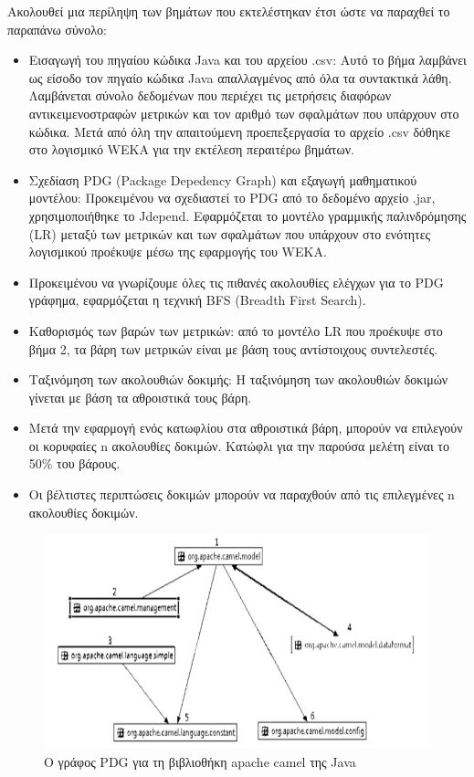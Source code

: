 \documentclass[12pt]{article}
\begin{document}
\par Ακολουθεί μια περίληψη των βημάτων που εκτελέστηκαν έτσι ώστε να παραχθεί το παραπάνω σύνολο:

\begin{itemize}
\item Εισαγωγή του πηγαίου κώδικα Java και του αρχείου .csv: Αυτό το βήμα λαμβάνει ως είσοδο τον πηγαίο κώδικα Java απαλλαγμένος από όλα τα συντακτικά λάθη. Λαμβάνεται σύνολο δεδομένων που περιέχει τις μετρήσεις διαφόρων αντικειμενοστραφών μετρικών και τον αριθμό των σφαλμάτων που υπάρχουν στο κώδικα. Μετά από όλη την απαιτούμενη προεπεξεργασία το αρχείο .csv δόθηκε στο λογισμικό WEKA για την εκτέλεση περαιτέρω βημάτων.

\item Σχεδίαση PDG (Package Depedency Graph) και εξαγωγή μαθηματικού μοντέλου: Προκειμένου να σχεδιαστεί το PDG από το δεδομένο αρχείο .jar, χρησιμοποιήθηκε το Jdepend. Εφαρμόζεται το μοντέλο γραμμικής παλινδρόμησης (LR) μεταξύ των μετρικών και των σφαλμάτων που υπάρχουν στο ενότητες λογισμικού προέκυψε μέσω της εφαρμογής του WEKA.

\item Προκειμένου να γνωρίζουμε όλες τις πιθανές ακολουθίες ελέγχων για το PDG γράφημα, εφαρμόζεται η τεχνική BFS (Breadth First Search).

\item Καθορισμός των βαρών των μετρικών: από το μοντέλο LR που προέκυψε στο βήμα 2, τα βάρη των μετρικών είναι με βάση τους αντίστοιχους συντελεστές.

\item Ταξινόμηση των ακολουθιών δοκιμής: Η ταξινόμηση των ακολουθιών δοκιμών γίνεται με βάση τα αθροιστικά τους βάρη. 

\item Μετά την εφαρμογή ενός κατωφλίου στα αθροιστικά βάρη, μπορούν να επιλεγούν οι κορυφαίες n ακολουθίες δοκιμών. Κατώφλι για την παρούσα μελέτη είναι το 50\% του βάρους.

\item Οι βέλτιστες περιπτώσεις δοκιμών μπορούν να παραχθούν από τις επιλεγμένες n ακολουθίες δοκιμών.

\end{itemize}
 
\begin{figure}
\label{fig:pdg_graph}
\caption{Ο γράφος PDG για τη βιβλιοθήκη apache camel της Java}
\includegraphics[width=\textwidth,height=\textheight,keepaspectratio]{pdg_graph.PNG}
\end{figure}
\end{document}
